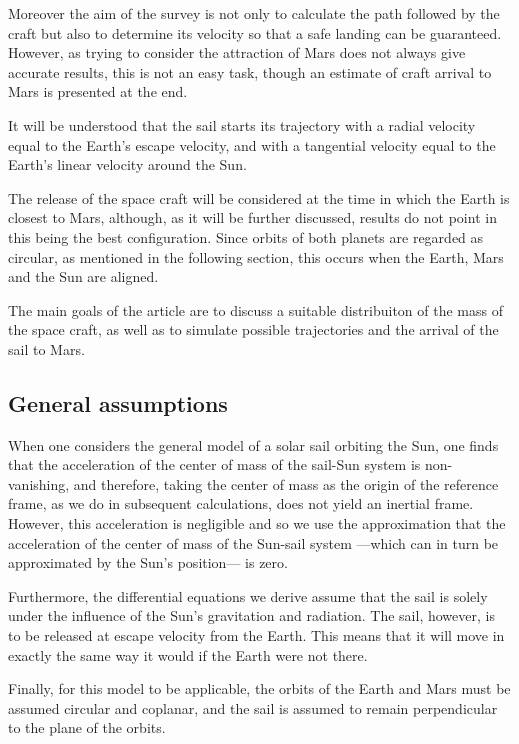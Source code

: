 \documentclass[twocolumn,12pt,a4paper]{article}
\numberwithin{equation}{section}
\begin{document}
  Moreover the aim of the survey is not only to calculate the path followed by the craft but also to determine its velocity so that a safe landing can be guaranteed. However, as trying to consider the attraction of Mars does not always give accurate results, this is not an easy task, though an estimate of craft arrival to Mars is presented at the end.
 
 It will be understood that the sail starts its trajectory with a radial velocity equal to the Earth's escape velocity, and with a tangential velocity equal to the Earth's linear velocity around the Sun. 
 
The release of the space craft will be considered at the time in which the Earth is closest to Mars, although, as it will be further discussed, results do not point in this being the best configuration. Since orbits of both planets are regarded as circular, as mentioned in the following section, this occurs when the Earth, Mars and the Sun are aligned.

The main goals of the article are to discuss a suitable distribuiton of the mass of the space craft, as well as to simulate possible trajectories and the arrival of the sail to Mars.

\subsection{General assumptions}
When one considers the general model of a solar sail orbiting the Sun, one finds that the acceleration of the center of mass of the sail-Sun system is non-vanishing, and therefore, taking the center of mass as the origin of the reference frame, as we do in subsequent calculations, does not yield an inertial frame. However, this acceleration is negligible and so we use the approximation that the acceleration of the center of mass of the Sun-sail system ---which can in turn be approximated by the Sun's position--- is zero.

Furthermore, the differential equations we derive assume that the sail is solely under the influence of the Sun's gravitation and radiation. The sail, however, is to be released at escape velocity from the Earth. This means that it will move in exactly the same way it would if the Earth were not there. 

Finally, for this model to be applicable, the orbits of the Earth and Mars must be assumed circular and coplanar, and the sail is assumed to remain perpendicular to the plane of the orbits.
\end{document}
